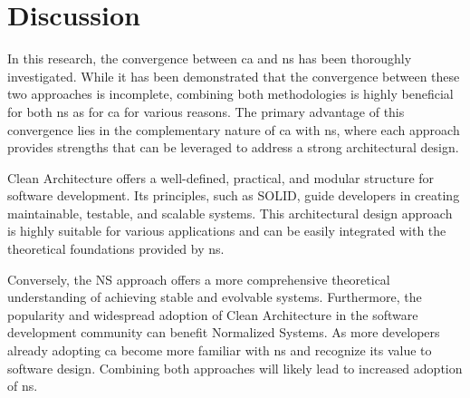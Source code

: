 \section{Discussion}

In this research, the convergence between \gls{ca} and \gls{ns} has been thoroughly
investigated. While it has been demonstrated that the convergence between these two
approaches is incomplete, combining both methodologies is highly beneficial for both
\gls{ns} as for \gls{ca} for various reasons. The primary advantage of this convergence
lies in the complementary nature of \gls{ca} with \gls{ns}, where each approach provides
strengths that can be leveraged to address a strong architectural design. 

Clean Architecture offers a well-defined, practical, and modular structure for software
development. Its principles, such as SOLID, guide developers in creating maintainable,
testable, and scalable systems. This architectural design approach is highly suitable for
various applications and can be easily integrated with the theoretical foundations
provided by \gls{ns}. 

Conversely, the NS approach offers a more comprehensive theoretical understanding of
achieving stable and evolvable systems. Furthermore, the popularity and widespread
adoption of Clean Architecture in the software development community can benefit
Normalized Systems. As more developers already adopting \acrlong{ca} become more familiar
with \acrlong{ns} and recognize its value to software design. Combining both approaches
will likely lead to increased adoption of \acrlong{ns}.